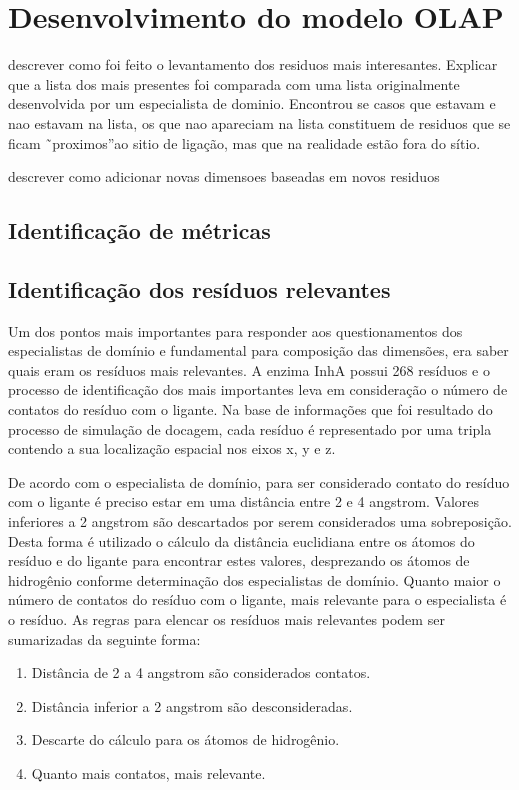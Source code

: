 \chapter{Desenvolvimento do modelo OLAP}

descrever como foi feito o levantamento dos residuos mais interesantes. Explicar que a lista dos mais presentes foi comparada com uma lista originalmente desenvolvida por um especialista de dominio. Encontrou se casos que estavam e nao estavam na lista, os que nao apareciam na lista constituem de residuos que se ficam ˜proximos”ao sitio de ligação, mas que na realidade estão fora do sítio.

descrever como  adicionar novas dimensoes baseadas em novos residuos

\section{Identificação de métricas}

\section{Identificação dos resíduos relevantes}
Um dos pontos mais importantes para responder aos questionamentos dos especialistas de domínio e fundamental para composição das dimensões, era saber quais eram os resíduos mais relevantes. A enzima InhA possui 268 resíduos \cite{KARANADUNOSM09} e o processo de identificação dos mais importantes leva em consideração o número de contatos do resíduo com o ligante. Na base de informações que foi resultado do processo de simulação de docagem, cada resíduo é representado por uma tripla contendo a sua localização espacial nos eixos x, y e z.

De acordo com o especialista de domínio, para ser considerado contato do resíduo com o ligante é preciso estar em uma distância entre 2 e 4 angstrom. Valores inferiores a 2 angstrom são descartados por serem considerados uma sobreposição. Desta forma é utilizado o cálculo da distância euclidiana entre os átomos do resíduo e do ligante \cite{KARANADUNOSM09} para encontrar estes valores, desprezando os átomos de hidrogênio conforme determinação dos especialistas de domínio. Quanto maior o número de contatos do resíduo com o ligante, mais relevante para o especialista é o resíduo. As regras para elencar os resíduos mais relevantes podem ser sumarizadas da seguinte forma:

\begin{enumerate}
    \item Distância de 2 a 4 angstrom são considerados contatos.
    \item Distância inferior a 2 angstrom são desconsideradas. 
    \item Descarte do cálculo para os átomos de hidrogênio.
    \item Quanto mais contatos, mais relevante.
\end{enumerate} 

